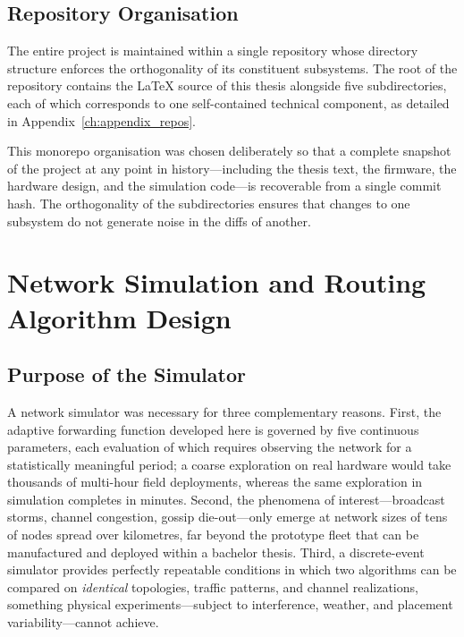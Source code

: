\documentclass[english,bachelor]{tfgitic}[2026/01/22]
\begin{document}

\subsection{Repository Organisation}

The entire project is maintained within a single repository whose directory structure enforces the orthogonality of its constituent subsystems. The root of the repository contains the LaTeX source of this thesis alongside five subdirectories, each of which corresponds to one self-contained technical component, as detailed in Appendix~\ref{ch:appendix_repos}.

This monorepo organisation was chosen deliberately so that a complete snapshot of the project at any point in history---including the thesis text, the firmware, the hardware design, and the simulation code---is recoverable from a single commit hash. The orthogonality of the subdirectories ensures that changes to one subsystem do not generate noise in the diffs of another.



\section{Network Simulation and Routing Algorithm Design}
\label{ch:simulation}

\subsection{Purpose of the Simulator}

A network simulator was necessary for three complementary reasons. First, the adaptive forwarding function developed here is governed by five continuous parameters, each evaluation of which requires observing the network for a statistically meaningful period; a coarse exploration on real hardware would take thousands of multi-hour field deployments, whereas the same exploration in simulation completes in minutes. Second, the phenomena of interest---broadcast storms, channel congestion, gossip die-out---only emerge at network sizes of tens of nodes spread over kilometres, far beyond the prototype fleet that can be manufactured and deployed within a bachelor thesis. Third, a discrete-event simulator provides perfectly repeatable conditions in which two algorithms can be compared on \emph{identical} topologies, traffic patterns, and channel realizations, something physical experiments---subject to interference, weather, and placement variability---cannot achieve.
\end{document}
